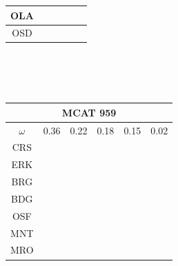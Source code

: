 \documentclass[12pt]{article}
\begin{document}
\begin{landscape}
\begin{figure}
\begin{minipage}[c]{0.3\textwidth}
\begin{tabular}{|c|c|c|c|c|c|}
        OLA&\cellcolor[HTML]{984EA3}&\cellcolor[HTML]{FF7F00}&\cellcolor[HTML]{984EA3}&\cellcolor[HTML]{FF7F00}&\cellcolor[HTML]{984EA3}\\ \hline %
        OSD&\cellcolor[HTML]{984EA3}&\cellcolor[HTML]{FF7F00}&\cellcolor[HTML]{984EA3}&\cellcolor[HTML]{FF7F00}&\cellcolor[HTML]{984EA3}\\ \hline %
\end{tabular}\\$~$\\$~$\\
\begin{tabular}{|c|c|c|c|c|c|}%
         \hline \multicolumn{6}{|c|}{MCAT 959} \\ \hline
         $\omega$&0.36&0.22&0.18&0.15&0.02\\ \hline %
        CRS&\cellcolor[HTML]{E41A1C}&\cellcolor[HTML]{E41A1C}&\cellcolor[HTML]{E41A1C}&\cellcolor[HTML]{E41A1C}&\cellcolor[HTML]{E41A1C}\\ \hline %
        ERK&\cellcolor[HTML]{377EB8}&\cellcolor[HTML]{E41A1C}&\cellcolor[HTML]{377EB8}&\cellcolor[HTML]{E41A1C}&\cellcolor[HTML]{E41A1C}\\ \hline %
        BRG&\cellcolor[HTML]{4DAF4A}&\cellcolor[HTML]{E41A1C}&\cellcolor[HTML]{377EB8}&\cellcolor[HTML]{377EB8}&\cellcolor[HTML]{377EB8}\\ \hline %
        BDG&\cellcolor[HTML]{984EA3}&\cellcolor[HTML]{377EB8}&\cellcolor[HTML]{4DAF4A}&\cellcolor[HTML]{4DAF4A}&\cellcolor[HTML]{377EB8}\\ \hline %
        OSF&\cellcolor[HTML]{984EA3}&\cellcolor[HTML]{377EB8}&\cellcolor[HTML]{4DAF4A}&\cellcolor[HTML]{4DAF4A}&\cellcolor[HTML]{4DAF4A}\\ \hline %
        MNT&\cellcolor[HTML]{984EA3}&\cellcolor[HTML]{377EB8}&\cellcolor[HTML]{4DAF4A}&\cellcolor[HTML]{4DAF4A}&\cellcolor[HTML]{4DAF4A}\\ \hline %
        MRO&\cellcolor[HTML]{FF7F00}&\cellcolor[HTML]{4DAF4A}&\cellcolor[HTML]{984EA3}&\cellcolor[HTML]{984EA3}&\cellcolor[HTML]{4DAF4A}\\ \hline %

\end{tabular}
\end{minipage}
\end{figure}
\end{landscape}
\end{document}

